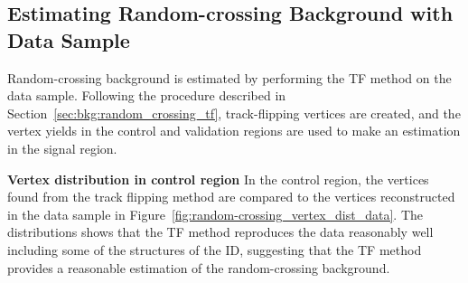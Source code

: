 \subsection{Estimating Random-crossing Background with Data Sample}
\label{sec:bkg:random_crossing_data}

Random-crossing background is estimated by performing the TF method on the data sample. Following the procedure described in Section~\ref{sec:bkg:random_crossing_tf}, track-flipping vertices are created, and the vertex yields in the control and validation regions are used to make an estimation in the signal region. 

\textbf{Vertex distribution in control region} In the control region, the \xx vertices found from the track flipping method are compared to the vertices reconstructed in the data sample in Figure~\ref{fig:random-crossing_vertex_dist_data}. The distributions shows that the TF method reproduces the data reasonably well including some of the structures of the ID, suggesting that the TF method provides a reasonable estimation of the random-crossing background.


